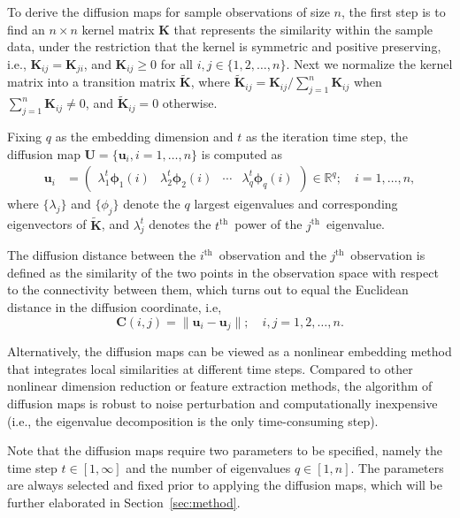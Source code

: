 \documentclass[12pt]{article}
\theoremstyle{definition}
\begin{document}
	To derive the diffusion maps for sample observations of size $n$, the first step is to find an $n \times n$ kernel matrix $\mathbf{K}$ that represents the similarity within the sample data, under the restriction that the kernel is symmetric and positive preserving, i.e., $\mathbf{K}_{ij}=\mathbf{K}_{ji}$, and $\mathbf{K}_{ij} \geq 0$ for all $i,j \in \{1, 2, \ldots, n\}$. Next we normalize the kernel matrix into a transition matrix $\mathbf{\widetilde{K}}$, where $\mathbf{\widetilde{K}}_{ij} = \mathbf{K}_{ij} / \sum\limits_{j=1}^{n} \mathbf{K}_{ij}$ when $\sum\limits_{j=1}^{n} \mathbf{K}_{ij} \neq 0$, and $\mathbf{\widetilde{K}}_{ij}=0$ otherwise.
	
	Fixing $q$ as the embedding dimension and $t$ as the iteration time step, the diffusion map $\mathbf{U}=\{\mathbf{u}_i, i=1,\ldots,n\}$ is computed as 
	\begin{align}
		\label{eq:U}
		\mathbf{u}_i  &= \begin{pmatrix} \lambda^{t}_{1} \mathbf{\phi}_{1}(i) & \lambda^{t}_{2} \mathbf{\phi}_{2} (i)  & \cdots & \lambda^{t}_{q} \mathbf{\phi}_{q}(i) \end{pmatrix} \in \mathbb{R}^{q}; \quad i = 1, \ldots, n,
	\end{align}
	where $\{ \lambda_{j} \}$ and $\{ \phi_{j}  \}$ denote the $q$ largest eigenvalues and corresponding eigenvectors of $\mathbf{\widetilde{K}}$, and $\lambda^{t}_{j}$ denotes the $t^{\mbox{th}}$~power of the $j^{\mbox{th}}$~eigenvalue.
	
	The diffusion distance between the $i^{\mbox{th}}$~observation and the $j^{\mbox{th}}$~observation is defined as the similarity of the two points in the observation space with respect to the connectivity between them, which turns out to equal the Euclidean distance in the diffusion coordinate, i.e,
	\begin{equation}
		\label{eq:diffusion}
		\mathbf{C}(i,j)  =   \| \mathbf{u}_i - \mathbf{u}_j \|; \quad i,j = 1,2, \ldots , n.
	\end{equation}
	
	Alternatively, the diffusion maps can be viewed as a nonlinear embedding method that integrates local similarities at different time steps. Compared to other nonlinear dimension reduction or feature extraction methods, the algorithm of diffusion maps is robust to noise perturbation and computationally inexpensive (i.e., the eigenvalue decomposition is the only time-consuming step). 
	
	Note that the diffusion maps require two parameters to be specified, namely the time step $t \in [1,\infty]$ and the number of eigenvalues $q \in [1,n]$. The parameters are always selected and fixed prior to applying the diffusion maps, which will be further elaborated in Section~\ref{sec:method}. 
	
\end{document}
